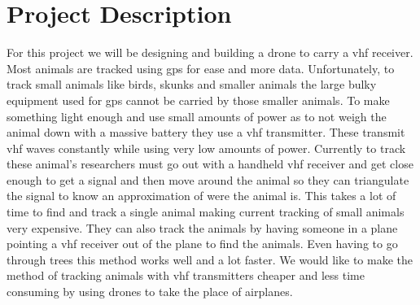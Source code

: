 \documentclass[onecolumn, draftclsnofoot,10pt, compsoc]{IEEEtran}
\begin{document}
\section{Project Description}
For this project we will be designing and building a drone to carry a vhf receiver. Most animals are tracked using gps for ease and more data. Unfortunately, to track small animals like birds, skunks and smaller animals the large bulky equipment used for gps cannot be carried by those smaller animals. To make something light enough and use small amounts of power as to not weigh the animal down with a massive battery they use a vhf transmitter. These transmit vhf waves constantly while using very low amounts of power. Currently to track these animal’s researchers must go out with a handheld vhf receiver and get close enough to get a signal and then move around the animal so they can triangulate the signal to know an approximation of were the animal is. This takes a lot of time to find and track a single animal making current tracking of small animals very expensive. They can also track the animals by having someone in a plane pointing a vhf receiver out of the plane to find the animals. Even having to go through trees this method works well and a lot faster. We would like to make the method of tracking animals with vhf transmitters cheaper and less time consuming by using drones to take the place of airplanes.
\end{document}
